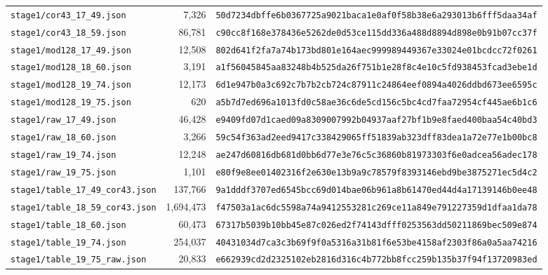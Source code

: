 \documentclass[11pt,reqno]{amsart}
\theoremstyle{definition}
\theoremstyle{remark}
\numberwithin{equation}{section}
\numberwithin{table}{section}
\begin{document}
{\begin{longtable}{@{}>{\raggedright\arraybackslash}p{1.90in}r>{\raggedright\arraybackslash}p{3.35in}@{}}
\nolinkurl{stage1/cor43_17_49.json} & 7,326 & \nolinkurl{50d7234dbffe6b0367725a9021baca1e0af0f58b38e6a293013b6fff5daa34af} \\
\nolinkurl{stage1/cor43_18_59.json} & 86,781 & \nolinkurl{c90cc8f168e378436e5262de0d53ce115dd336a488d8894d898e0b91b07cc37f} \\
\nolinkurl{stage1/mod128_17_49.json} & 12,508 & \nolinkurl{802d641f2fa7a74b173bd801e164aec999989449367e33024e01bcdcc72f0261} \\
\nolinkurl{stage1/mod128_18_60.json} & 3,191 & \nolinkurl{a1f56045845aa83248b4b525da26f751b1e28f8c4e10c5fd938453fcad3ebe1d} \\
\nolinkurl{stage1/mod128_19_74.json} & 12,173 & \nolinkurl{6d1e947b0a3c692c7b7b2cb724c87911c24864eef0894a4026ddbd673ee6595c} \\
\nolinkurl{stage1/mod128_19_75.json} & 620 & \nolinkurl{a5b7d7ed696a1013fd0c58ae36c6de5cd156c5bc4cd7faa72954cf445ae6b1c6} \\
\nolinkurl{stage1/raw_17_49.json} & 46,428 & \nolinkurl{e9409fd07d1caed09a8309007992b04937aaf27bf1b9e8faed400baa54c40bd3} \\
\nolinkurl{stage1/raw_18_60.json} & 3,266 & \nolinkurl{59c54f363ad2eed9417c338429065ff51839ab323dff83dea1a72e77e1b00bc8} \\
\nolinkurl{stage1/raw_19_74.json} & 12,248 & \nolinkurl{ae247d60816db681d0bb6d77e3e76c5c36860b81973303f6e0adcea56adec178} \\
\nolinkurl{stage1/raw_19_75.json} & 1,101 & \nolinkurl{e80f9e8ee01402316f2e630e13b9a9c78579f8393146ebd9be3875271ec5d4c2} \\
\nolinkurl{stage1/table_17_49_cor43.json} & 137,766 & \nolinkurl{9a1dddf3707ed6545bcc69d014bae06b961a8b61470ed44d4a17139146b0ee48} \\
\nolinkurl{stage1/table_18_59_cor43.json} & 1,694,473 & \nolinkurl{f47503a1ac6dc5598a74a9412553281c269ce11a849e791227359d1dfaa1da78} \\
\nolinkurl{stage1/table_18_60.json} & 60,473 & \nolinkurl{67317b5039b10bb45e87c026ed2f74143dfff0253563dd50211869bec509e874} \\
\nolinkurl{stage1/table_19_74.json} & 254,037 & \nolinkurl{40431034d7ca3c3b69f9f0a5316a31b81f6e53be4158af2303f86a0a5aa74216} \\
\nolinkurl{stage1/table_19_75_raw.json} & 20,833 & \nolinkurl{e662939cd2d2325102eb2816d316c4b772bb8fcc259b135b37f94f13720983ed} \\
\end{longtable}
}
\end{document}
